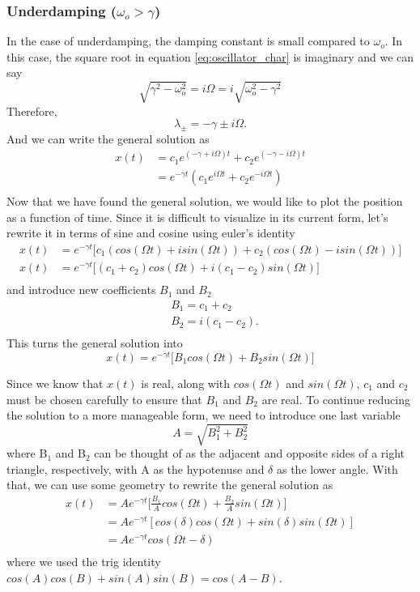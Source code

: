 \documentclass{article}
\newcommand{\be}{\begin{equation}}
\newcommand{\ee}{\end{equation}}
\begin{document}
\subsubsection*{Underdamping ($\omega_o > \gamma$)}
In the case of underdamping, the damping constant is small compared to $\omega_o$. In this case, the square root in equation \ref{eq:oscillator_char} is imaginary and we can say
\be
\sqrt{\gamma^2 - \omega_o^2} = i \Omega = i \sqrt{\omega_o^2 - \gamma^2}
\ee
Therefore,
\be
\lambda_{\pm} = -\gamma \pm i \Omega .
\ee
And we can write the general solution as
\be
\begin{split}
x(t) &= c_1 e^{(-\gamma + i \Omega)t} + c_2 e^{(-\gamma - i \Omega)t} \\
&= e^{-\gamma t}(c_1 e^{i \Omega t} + c_2 e^{-i \Omega t}) \\
\end{split}
\ee
Now that we have found the general solution, we would like to plot the position as a function of time. Since it is difficult to visualize in its current form, let's rewrite it in terms of sine and cosine using euler's identity
\be
\begin{split}
x(t) &= e^{-\gamma t} \big[ c_1(cos(\Omega t) + i sin(\Omega t)) + c_2(cos(\Omega t) - i sin(\Omega t)) \big] \\
x(t) &= e^{-\gamma t} \big[ (c_1 + c_2)cos(\Omega t) + i(c_1 - c_2)sin(\Omega t) \big] \\
\end{split}
\ee
and introduce new coefficients $B_1$ and $B_2$
\be
\begin{split}
&B_1 = c_1 + c_2 \\
&B_2 = i(c_1 - c_2) . \\
\end{split}
\ee
This turns the general solution into
\be
x(t) = e^{-\gamma t} \big[ B_1 cos(\Omega t) + B_2 sin(\Omega t)]
\ee

Since we know that $x(t)$ is real, along with $cos(\Omega t)$ and $sin(\Omega t)$, $c_1$ and $c_2$ must be chosen carefully to ensure that $B_1$ and $B_2$ are real. To continue reducing the solution to a more manageable form, we need to introduce one last variable
\be
A = \sqrt{B_1^2 + B_2^2}
\ee
where B$_1$ and B$_2$ can be thought of as the adjacent and opposite sides of a right triangle, respectively, with A as the hypotenuse and $\delta$ as the lower angle.
With that, we can use some geometry to rewrite the general solution as
\be
\begin{split}
x(t) &= Ae^{-\gamma t} \Big[\frac{B_1}{A}cos(\Omega t) + \frac{B_2}{A}sin(\Omega t) \Big]\\
 &= Ae^{-\gamma t} [cos(\delta)cos(\Omega t) + sin(\delta)sin(\Omega t)]\\
 &= Ae^{-\gamma t} cos(\Omega t - \delta)\\
\end{split}
\ee
where we used the trig identity $cos(A)cos(B) + sin(A)sin(B) = cos(A-B)$.
\end{document}
